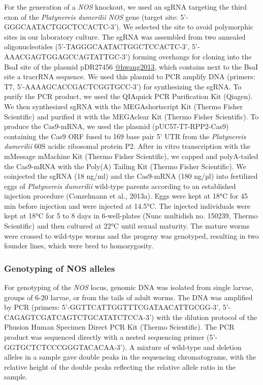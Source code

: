 \documentclass[
  11pt,
  letterpaper,
  DIV=11,
  numbers=noendperiod]{scrartcl}
\begin{document}
For the generation of a \emph{NOS} knockout, we used an sgRNA targeting
the third exon of the \emph{Platynereis dumerilii} \emph{NOS} gene
(target site: 5'-GGGCAATACTGGCTCCACTC-3'). We selected the site to avoid
polymorphic sites in our laboratory culture. The sgRNA was assembled
from two annealed oligonucleotides (5'-TAGGGCAATACTGGCTCCACTC-3',
5'-AAACGAGTGGAGCCAGTATTGC-3') forming overhangs for cloning into the
BsaI site of the plasmid pDR27456 \href{42250,\%20Addgene}{@hwang2013},
which contains next to the BsaI site a tracrRNA sequence. We used this
plasmid to PCR amplify DNA (primers: T7, 5'-AAAAGCACCGACTCGGTGCC-3') for
synthesizing the sgRNA. To purify the PCR product, we used the QIAquick
PCR Purification Kit (Qiagen). We then synthesized sgRNA with the
MEGAshortscript Kit (Thermo Fisher Scientific) and purified it with the
MEGAclear Kit (Thermo Fisher Scientific). To produce the Cas9-mRNA, we
used the plasmid (pUC57-T7-RPP2-Cas9) containing the Cas9 ORF fused to
169 base pair 5' UTR from the \emph{Platynereis dumerilii} 60S acidic
ribosomal protein P2. After in vitro transcription with the mMessage
mMachine Kit (Thermo Fisher Scientific), we capped and polyA-tailed the
Cas9-mRNA with the Poly(A) Tailing Kit (Thermo Fisher Scientific). We
coinjected the sgRNA (18 ng/ml) and the Cas9-mRNA (180 ng/µl) into
fertilized eggs of \emph{Platynereis dumerilii} wild-type parents
according to an established injection procedure (Conzelmann et al.,
2013a). Eggs were kept at 18°C for 45 min before injection and were
injected at 14.5°C. The injected individuals were kept at 18°C for 5 to
8 days in 6-well-plates (Nunc multidish no. 150239, Thermo Scientific)
and then cultured at 22°C until sexual maturity. The mature worms were
crossed to wild-type worms and the progeny was genotyped, resulting in
two founder lines, which were bred to homozygosity.

\subsubsection{Genotyping of NOS
alleles}\label{genotyping-of-nos-alleles}

For genotyping of the \emph{NOS} locus, genomic DNA was isolated from
single larvae, groups of 6-20 larvae, or from the tails of adult worms.
The DNA was amplified by PCR (primers:
5'-GGTTCATTGGTTTCGATAACATTGCGG-3', 5'-CAGAGTCGATCAGTCTGCATATCTCCA-3')
with the dilution protocol of the Phusion Human Specimen Direct PCR Kit
(Thermo Scientific). The PCR product was sequenced directly with a
nested sequencing primer (5'-GGTGCTCTCCCGGGTACACAA-3'). A mixture of
wild-type and deletion alleles in a sample gave double peaks in the
sequencing chromatograms, with the relative height of the double peaks
reflecting the relative allele ratio in the sample.
\end{document}
